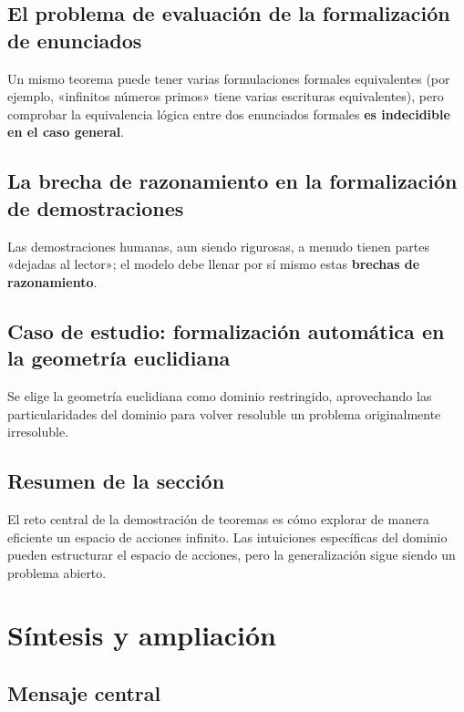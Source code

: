 \documentclass[a4paper]{article}
\begin{document}
\subsection{El problema de evaluación de la formalización de enunciados}

Un mismo teorema puede tener varias formulaciones formales equivalentes (por ejemplo, «infinitos números primos» tiene varias escrituras equivalentes), pero comprobar la equivalencia lógica entre dos enunciados formales \textbf{es indecidible en el caso general}.

\subsection{La brecha de razonamiento en la formalización de demostraciones}

Las demostraciones humanas, aun siendo rigurosas, a menudo tienen partes «dejadas al lector»; el modelo debe llenar por sí mismo estas \textbf{brechas de razonamiento}.

\subsection{Caso de estudio: formalización automática en la geometría euclidiana}

Se elige la geometría euclidiana como dominio restringido, aprovechando las particularidades del dominio para volver resoluble un problema originalmente irresoluble.

\subsection{Resumen de la sección}

El reto central de la demostración de teoremas es cómo explorar de manera eficiente un espacio de acciones infinito. Las intuiciones específicas del dominio pueden estructurar el espacio de acciones, pero la generalización sigue siendo un problema abierto.
\section{Síntesis y ampliación}

\subsection{Mensaje central}
\end{document}
